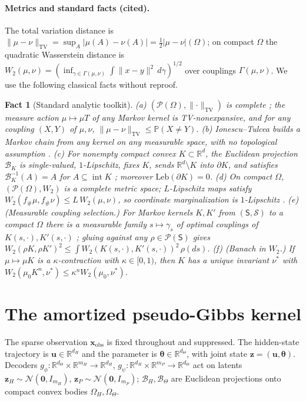 \documentclass[11pt]{article}
\DeclareMathOperator{\intr}{int}
\theoremstyle{plain}
\newtheorem{fact}[theorem]{Fact}
\theoremstyle{definition}
\theoremstyle{remark}
\newcommand{\R}{\mathbb{R}}
\newcommand{\Prob}{\mathbb{P}}
\newcommand{\cP}{\mathcal{P}}
\newcommand{\Om}{\Omega}
\newcommand{\Leb}{\mathrm{Leb}}
\newcommand{\TV}{\mathrm{TV}}
\newcommand{\Normal}{\mathcal{N}}
\newcommand{\xobs}{\bm{x}_{\mathrm{obs}}}
\newcommand{\bth}{\bm{\theta}}
\newcommand{\bu}{\bm{u}}
\newcommand{\bz}{\bm{z}}
\newcommand{\push}{{}_{\#}}
\newcommand{\norm}[1]{\lVert #1 \rVert}
\newcommand{\abs}[1]{\lvert #1 \rvert}
\begin{document}
\paragraph{Metrics and standard facts (cited).}
The total variation distance is $\norm{\mu-\nu}_\TV=\sup_{A}\abs{\mu(A)-\nu(A)}=\tfrac12\abs{\mu-\nu}(\Om)$;
on compact $\Om$ the quadratic Wasserstein distance is
$W_2(\mu,\nu)=(\inf_{\gamma\in\Gamma(\mu,\nu)}\int\norm{x-y}^2\,d\gamma)^{1/2}$ over couplings
$\Gamma(\mu,\nu)$. We use the following classical facts without reproof.
\begin{fact}[Standard analytic toolkit]
\label{fact:std}
\emph{(a)} $(\cP(\Om),\norm{\cdot}_\TV)$ is complete \citep{folland}; the measure action
$\mu\mapsto\mu T$ of any Markov kernel is TV-nonexpansive, and for any coupling $(X,Y)$ of $\mu,\nu$,
$\norm{\mu-\nu}_\TV\le\Prob(X\neq Y)$. \emph{(b)} Ionescu--Tulcea builds a Markov chain from any kernel
on any measurable space, with no topological assumption \citep{kallenberg}. \emph{(c)} For nonempty
compact convex $K\subset\R^d$, the Euclidean projection $\mathcal B_K$ is single-valued, $1$-Lipschitz,
fixes $K$, sends $\R^d\setminus K$ into $\partial K$, and satisfies $\mathcal B_K^{-1}(A)=A$ for
$A\subseteq\intr K$ \citep{hiriart}; moreover $\Leb(\partial K)=0$. \emph{(d)} On compact $\Om$,
$(\cP(\Om),W_2)$ is a complete metric space; $L$-Lipschitz maps satisfy
$W_2(f\push\mu,f\push\nu)\le L\,W_2(\mu,\nu)$, so coordinate marginalization is $1$-Lipschitz
\citep{villani}. \emph{(e)} \textup{(Measurable coupling selection.)} For Markov kernels $K,K'$ from
$(\mathsf S,\mathcal S)$ to a compact $\Om$ there is a measurable family $s\mapsto\gamma_s$ of optimal
couplings of $K(s,\cdot),K'(s,\cdot)$ \citep[Cor.~5.22]{villani}; gluing against any
$\rho\in\cP(\mathsf S)$ gives
$W_2(\rho K,\rho K')^2\le\int W_2(K(s,\cdot),K'(s,\cdot))^2\,\rho(ds)$. \emph{(f)}
\textup{(Banach in $W_2$.)} If $\mu\mapsto\mu K$ is a $\kappa$-contraction with $\kappa\in[0,1)$, then
$K$ has a unique invariant $\nu^\ast$ with $W_2(\mu_0 K^n,\nu^\ast)\le\kappa^n W_2(\mu_0,\nu^\ast)$.
\end{fact}

\section{The amortized pseudo-Gibbs kernel}
\label{sec:kernel}

The sparse observation $\xobs$ is fixed throughout and suppressed. The hidden-state trajectory is
$\bu\in\R^{d_H}$ and the parameter is $\bth\in\R^{d_\Theta}$, with joint state $\bz=(\bu,\bth)$.
Decoders $g_\phi:\R^{d_\Theta}\times\R^{m_H}\to\R^{d_H}$, $g_\psi:\R^{d_H}\times\R^{m_P}\to\R^{d_\Theta}$
act on latents $\bm z_H\sim\Normal(\bm0,I_{m_H})$, $\bm z_P\sim\Normal(\bm0,I_{m_P})$;
$\mathcal B_H,\mathcal B_\Theta$ are Euclidean projections onto compact convex bodies
$\Om_H,\Om_\Theta$.
\end{document}
